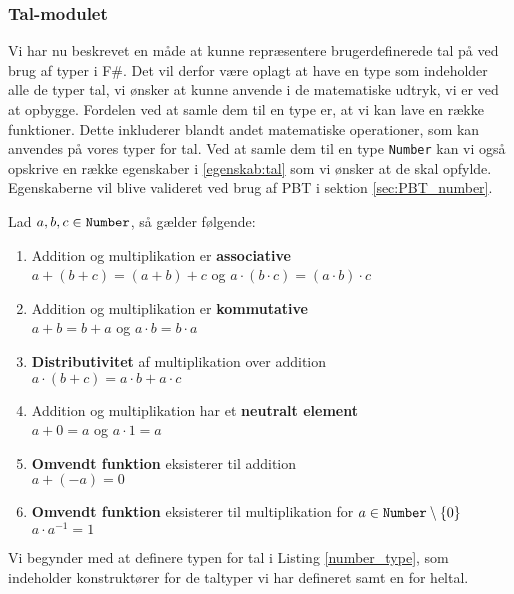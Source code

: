 \subsubsection{Tal-modulet}
Vi har nu beskrevet en måde at kunne repræsentere brugerdefinerede tal på ved brug af typer i F\#. Det vil derfor være oplagt at have en type som indeholder alle de typer tal, vi ønsker at kunne anvende i de matematiske udtryk, vi er ved at opbygge. Fordelen ved at samle dem til en type er, at vi kan lave en række funktioner. Dette inkluderer blandt andet matematiske operationer, som kan anvendes på  vores typer for tal. Ved at samle dem til en type \texttt{Number} kan vi også opskrive en række egenskaber i \ref{egenskab:tal} som vi ønsker at de skal opfylde. Egenskaberne vil blive valideret ved brug af PBT i sektion \ref{sec:PBT_number}.

\vspace{0.5cm}
\begin{egenskab}\label{egenskab:tal}
  Lad $a, b, c \in \text{\texttt{Number}}$, så gælder følgende:
  \begin{enumerate}
    \item Addition og multiplikation er \textbf{associative} \\ $a + (b + c) = (a + b) + c$ og $a \cdot (b \cdot c) = (a \cdot b) \cdot c$
    \item Addition og multiplikation er \textbf{kommutative} \\ $a + b = b + a$ og $a \cdot b = b \cdot a$
    \item \textbf{Distributivitet} af multiplikation over addition \\ $a \cdot (b + c) = a \cdot b + a \cdot c$
    \item Addition og multiplikation har et \textbf{neutralt element} \\ $a + 0 = a$ og $a \cdot 1 = a$
    \item \textbf{Omvendt funktion} eksisterer til addition \\ $a + (-a) = 0$
    \item \textbf{Omvendt funktion} eksisterer til multiplikation for $a \in \text{\texttt{Number}} \setminus \{0\}$ \\ $a \cdot a^{-1} = 1$
\end{enumerate}
\end{egenskab}
  

Vi begynder med at definere typen for tal i Listing \ref{number_type}, som indeholder konstruktører for de taltyper vi har defineret samt en for heltal. 

